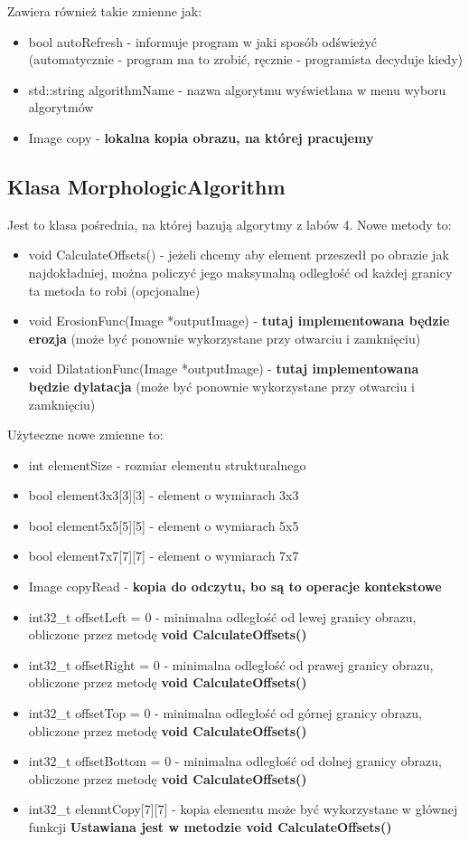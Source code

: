 \documentclass{article}
\begin{document}
Zawiera również takie zmienne jak:
\begin{itemize}
    \item bool autoRefresh - informuje program w jaki sposób odświeżyć (automatycznie - program ma to zrobić, ręcznie - programista decyduje kiedy)
    \item std::string algorithmName - nazwa algorytmu wyświetlana w menu wyboru algorytmów
    \item Image copy - \textbf{lokalna kopia obrazu, na której pracujemy}
\end{itemize}

\subsection{Klasa MorphologicAlgorithm}
Jest to klasa pośrednia, na której bazują algorytmy z labów 4.
Nowe metody to:
\begin{itemize}
    \item void CalculateOffsets() - jeżeli chcemy aby element przeszedł po obrazie jak najdokładniej, można policzyć jego maksymalną odległość od każdej granicy ta metoda to robi (opcjonalne)
    \item void ErosionFunc(Image *outputImage) - \textbf{tutaj implementowana będzie erozja} (może być ponownie wykorzystane przy otwarciu i zamknięciu)
    \item void DilatationFunc(Image *outputImage) - \textbf{tutaj implementowana będzie dylatacja} (może być ponownie wykorzystane przy otwarciu i zamknięciu)
\end{itemize}

Użyteczne nowe zmienne to:
\begin{itemize}
    \item int elementSize - rozmiar elementu strukturalnego
    \item bool element3x3[3][3] - element o wymiarach 3x3
    \item bool element5x5[5][5] - element o wymiarach 5x5
    \item bool element7x7[7][7] - element o wymiarach 7x7
    \item Image copyRead - \textbf{kopia do odczytu, bo są to operacje kontekstowe}
    \item int32\_t offsetLeft = 0 - minimalna odległość od lewej granicy obrazu, obliczone przez metodę \textbf{void CalculateOffsets()}
    \item int32\_t offsetRight = 0 - minimalna odległość od prawej granicy obrazu, obliczone przez metodę \textbf{void CalculateOffsets()}
    \item int32\_t offsetTop = 0 - minimalna odległość od górnej granicy obrazu, obliczone przez metodę \textbf{void CalculateOffsets()}
    \item int32\_t offsetBottom = 0 - minimalna odległość od dolnej granicy obrazu, obliczone przez metodę \textbf{void CalculateOffsets()}
    \item int32\_t elemntCopy[7][7] - kopia elementu może być wykorzystane w  głównej funkcji \textbf{Ustawiana jest w metodzie void CalculateOffsets()}
\end{itemize}
\end{document}
